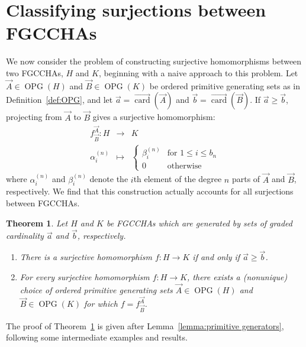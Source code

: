 \documentclass[11pt]{amsart}
\newtheorem{theorem}{Theorem}[section]
\theoremstyle{definition}
\numberwithin{equation}{section}
\newcommand{\FGCCHAs}{\textsf{FGCCHA}s\xspace}
\newcommand{\veccard}{\overrightarrow{\operatorname{card}}}
\newcommand{\OPG}{\operatorname{OPG}}
\begin{document}
\section{Classifying surjections between \FGCCHAs}
\label{sec:surjection}
We now consider the problem of constructing surjective homomorphisms between two \FGCCHAs, $H$ and $K$, beginning with a naive approach to this problem.  
Let $\vec{A} \in \OPG(H)$ and $\vec{B} \in \OPG(K)$ be ordered primitive generating sets as in Definition~\ref{def:OPG}, and let $\vec{a} = \veccard(\vec{A})$ and $\vec{b} = \veccard(\vec{B})$. 
If $\vec{a} \ge \vec{b}$, projecting from $\vec{A}$ to $\vec{B}$ gives a surjective homomorphism:
\begin{equation}
\label{eq:defaultsurjection}
\begin{array}{rcl}
f^{\vec{A}}_{\vec{B}}: H & \to & K \\[1ex]
\alpha^{(n)}_{i} & \mapsto & \begin{cases}
\beta^{(n)}_{i} & \text{for $1 \le i \le b_{n}$} \\
0 & \text{otherwise}
\end{cases}
\end{array}
\end{equation}
where $\alpha^{(n)}_{i}$ and $\beta^{(n)}_{i}$ denote the
$i$th element of the degree $n$ parts of $\vec{A}$ and $\vec{B}$, respectively.  
We find that this construction actually accounts for all surjections between \FGCCHAs.

\begin{theorem}
\label{thm:surjection}
Let $H$ and $K$ be \FGCCHAs which are generated by sets of graded cardinality $\vec{a}$ and $\vec{b}$, respectively.  
\begin{enumerate}
\item There is a surjective homomorphism $f: H \to K$ if and only if $\vec{a} \ge \vec{b}$.

\item For every surjective homomorphism $f: H \to K$, there exists a (nonunique) choice of
ordered primitive generating sets $\vec{A} \in \OPG(H)$ and $\vec{B} \in \OPG(K)$
for which $f = f^{\vec{A}}_{\vec{B}}$.

\end{enumerate}
\end{theorem}

The proof of Theorem~\ref{thm:surjection} is given after Lemma~\ref{lemma:primitive generators}, following some intermediate examples and results.
\end{document}
